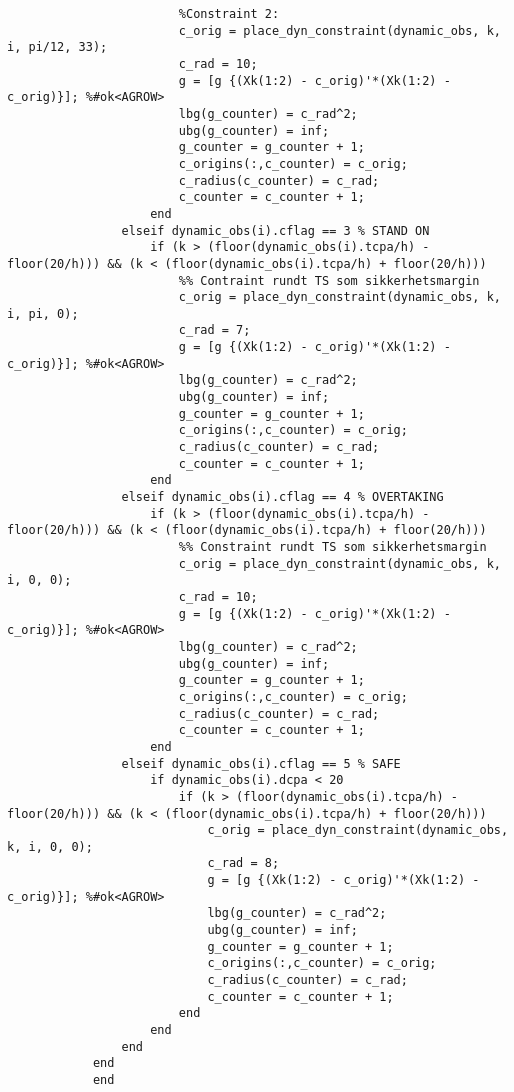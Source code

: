\begin{lstlisting}
                        %Constraint 2:
                        c_orig = place_dyn_constraint(dynamic_obs, k, i, pi/12, 33);
                        c_rad = 10;
                        g = [g {(Xk(1:2) - c_orig)'*(Xk(1:2) - c_orig)}]; %#ok<AGROW> 
                        lbg(g_counter) = c_rad^2;
                        ubg(g_counter) = inf;
                        g_counter = g_counter + 1;
                        c_origins(:,c_counter) = c_orig;
                        c_radius(c_counter) = c_rad;
                        c_counter = c_counter + 1;
                    end                
                elseif dynamic_obs(i).cflag == 3 % STAND ON
                    if (k > (floor(dynamic_obs(i).tcpa/h) - floor(20/h))) && (k < (floor(dynamic_obs(i).tcpa/h) + floor(20/h)))
                        %% Contraint rundt TS som sikkerhetsmargin
                        c_orig = place_dyn_constraint(dynamic_obs, k, i, pi, 0); 
                        c_rad = 7;
                        g = [g {(Xk(1:2) - c_orig)'*(Xk(1:2) - c_orig)}]; %#ok<AGROW> 
                        lbg(g_counter) = c_rad^2;
                        ubg(g_counter) = inf;
                        g_counter = g_counter + 1;
                        c_origins(:,c_counter) = c_orig;
                        c_radius(c_counter) = c_rad;
                        c_counter = c_counter + 1;
                    end
                elseif dynamic_obs(i).cflag == 4 % OVERTAKING
                    if (k > (floor(dynamic_obs(i).tcpa/h) - floor(20/h))) && (k < (floor(dynamic_obs(i).tcpa/h) + floor(20/h)))
                        %% Constraint rundt TS som sikkerhetsmargin
                        c_orig = place_dyn_constraint(dynamic_obs, k, i, 0, 0);
                        c_rad = 10;
                        g = [g {(Xk(1:2) - c_orig)'*(Xk(1:2) - c_orig)}]; %#ok<AGROW> 
                        lbg(g_counter) = c_rad^2;
                        ubg(g_counter) = inf;
                        g_counter = g_counter + 1;
                        c_origins(:,c_counter) = c_orig;
                        c_radius(c_counter) = c_rad;
                        c_counter = c_counter + 1;
                    end
                elseif dynamic_obs(i).cflag == 5 % SAFE
                    if dynamic_obs(i).dcpa < 20
                        if (k > (floor(dynamic_obs(i).tcpa/h) - floor(20/h))) && (k < (floor(dynamic_obs(i).tcpa/h) + floor(20/h)))
                            c_orig = place_dyn_constraint(dynamic_obs, k, i, 0, 0);
                            c_rad = 8;
                            g = [g {(Xk(1:2) - c_orig)'*(Xk(1:2) - c_orig)}]; %#ok<AGROW> 
                            lbg(g_counter) = c_rad^2;
                            ubg(g_counter) = inf;
                            g_counter = g_counter + 1;
                            c_origins(:,c_counter) = c_orig;
                            c_radius(c_counter) = c_rad;
                            c_counter = c_counter + 1;
                        end
                    end
                end
            end
            end
        

\end{lstlisting}
